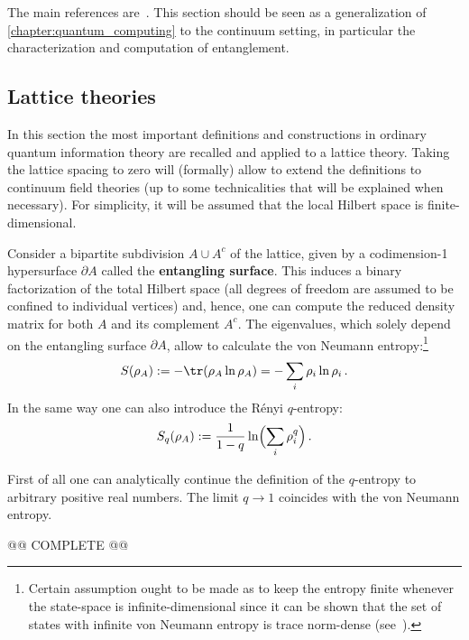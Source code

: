     The main references are~\citet{tuybens_entanglement_2017,rangamani_holographic_2017}. This section should be seen as a generalization of \cref{chapter:quantum_computing} to the continuum setting, in particular the characterization and computation of entanglement.

\subsection{Lattice theories}

    In this section the most important definitions and constructions in ordinary quantum information theory are recalled and applied to a lattice theory. Taking the lattice spacing to zero will (formally) allow to extend the definitions to continuum field theories (up to some technicalities that will be explained when necessary). For simplicity, it will be assumed that the local Hilbert space is finite-dimensional.

    Consider a bipartite subdivision $A\cup A^c$ of the lattice, given by a codimension-1 hypersurface $\partial A$ called the \textbf{entangling surface}. This induces a binary factorization of the total Hilbert space (all degrees of freedom are assumed to be confined to individual vertices) and, hence, one can compute the reduced density matrix for both $A$ and its complement $A^c$. The eigenvalues, which solely depend on the entangling surface $\partial A$, allow to calculate the von Neumann entropy:\footnote{Certain assumption ought to be made as to keep the entropy finite whenever the state-space is infinite-dimensional since it can be shown that the set of states with infinite von Neumann entropy is trace norm-dense (see~\citet{eisert_quantification_2002}).}
    \begin{gather}
        S(\rho_A) := -\tr(\rho_A\ln\rho_A) = -\sum_i\rho_i\ln\rho_i\,.
    \end{gather}
    In the same way one can also introduce the R\'enyi $q$-entropy:
    \begin{gather}
        S_q(\rho_A) := \frac{1}{1-q}\ln\Bigl(\sum_i\rho_i^q\Bigr)\,.
    \end{gather}
    \begin{property}
         First of all one can analytically continue the definition of the $q$-entropy to arbitrary positive real numbers. The limit $q\longrightarrow1$ coincides with the von Neumann entropy.
    \end{property}

    @@ COMPLETE @@